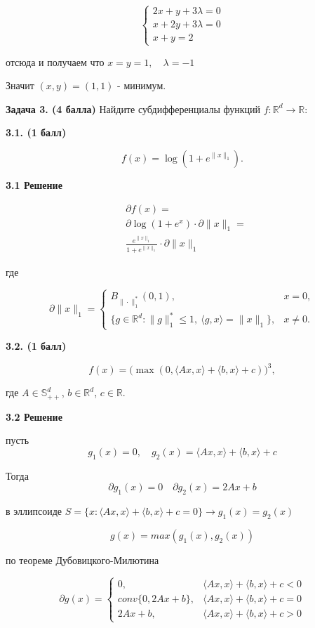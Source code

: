 \documentclass[12pt,a4paper]{article}
\begin{document}
$$
\begin{cases}
2x + y + 3\lambda = 0 \\
x + 2y + 3\lambda = 0 \\
x + y = 2
\end{cases}
$$

отсюда и получаем что $x = y = 1, \quad \lambda = -1$

Значит $(x, y) = (1, 1)$ - минимум.

\textbf{Задача 3. (4 балла)} Найдите субдифференциалы функций $f: \mathbb{R}^d \to \mathbb{R}$:

\textbf{3.1. (1 балл)}

\[
f(x) = \log \left(1 + e^{\|x\|_1}\right).
\]

\textbf{3.1 Решение}

$$
\begin{aligned}
  &\partial f(x) = \\
  &\partial \log \left(1 + e^{x}\right) \cdot \partial \| x \|_1 =\\
  &\frac{e^{\|x\|_1}}{1 + e^{\|x\|_1}} \cdot \partial \| x \|_1
\end{aligned}
$$

где

$$
\partial \|x\|_1 = 
\begin{cases}
B_{\|\cdot\|_1^*}(0,1), & x = 0, \\
\{ g \in \mathbb{R}^d : \|g\|_1^* \leq 1,\ \langle g, x \rangle = \|x\|_1\}, & x \neq 0.
\end{cases}
$$

\textbf{3.2. (1 балл)}

\[
f(x) = \bigl(\max (0, \langle Ax, x\rangle + \langle b, x\rangle + c)\bigr)^3,
\]

где $A \in \mathbb{S}^d_{++}$, $b \in \mathbb{R}^d$, $c \in \mathbb{R}$.

\textbf{3.2 Решение}

пусть 
$$g_1(x) = 0, \quad g_2(x) = \langle Ax, x\rangle + \langle b, x\rangle + c$$

Тогда 
$$\partial g_1(x) = {0} \quad \partial g_2(x) = {2Ax + b}$$

в эллипсоиде $S = \{x : \langle Ax, x\rangle + \langle b, x\rangle + c = 0\}  \rightarrow g_1(x) = g_2(x)$

$$
g(x) = max(g_1(x), g_2(x))
$$

по теореме Дубовицкого-Милютина 

$$
\partial g(x) = 
\begin{cases}
    {0}, & \langle Ax, x\rangle + \langle b, x\rangle + c < 0 \\
    conv\{0, 2Ax + b\}, & \langle Ax, x\rangle + \langle b, x\rangle + c = 0 \\
    2Ax + b, & \langle Ax, x\rangle + \langle b, x\rangle + c > 0
\end{cases}
$$
\end{document}
